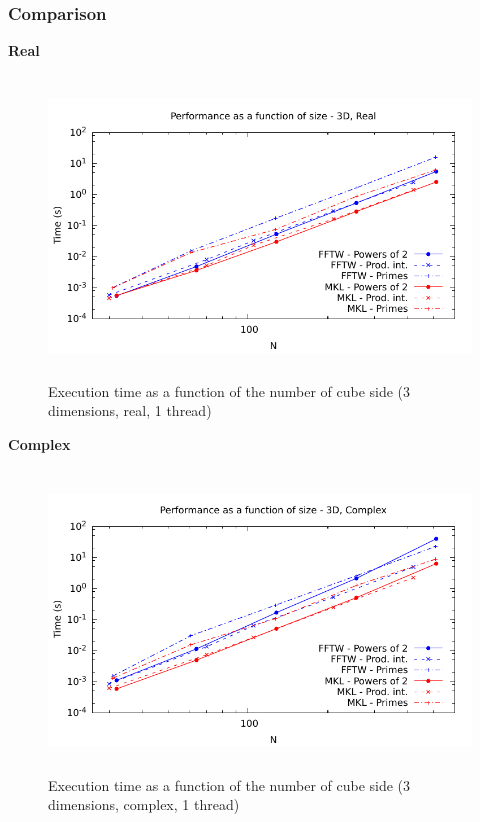 \documentclass[12pt, a4paper]{article}
\begin{document}
\subsubsection{Comparison}
{\bf Real}
\begin{figure}[H]
\captionsetup{width=0.6\textwidth}
\centering
\includegraphics[height=8cm]{graphs/performance/3d-r.pdf}
\caption{Execution time as a function of the number of cube side (3 dimensions, real, 1 thread)}
\label{3DR}
\end{figure}
{\bf Complex}
\begin{figure}[H]
\captionsetup{width=0.6\textwidth}
\centering
\includegraphics[height=8cm]{graphs/performance/3d-c.pdf}
\caption{Execution time as a function of the number of cube side (3 dimensions, complex, 1 thread)}
\label{3DC}
\end{figure}   
  
\end{document}
